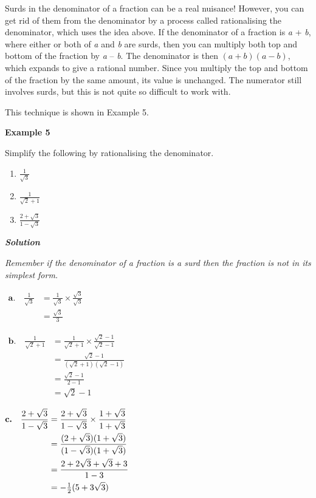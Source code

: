 \documentclass[
]{article}
\begin{document}
Surds in the denominator of a fraction can be a real nuisance! However,
you can get rid of them from the denominator by a process called
rationalising the denominator, which uses the idea above. If the
denominator of a fraction is \emph{a} + \emph{b}, where either or both
of \emph{a} and \emph{b} are surds, then you can multiply both top and
bottom of the fraction by \emph{a} -- \emph{b}. The denominator is then
\((a+b)(a-b)\), which expands to give a rational number. Since you
multiply the top and bottom of the fraction by the same amount, its
value is unchanged. The numerator still involves surds, but this is not
quite so difficult to work with.

This technique is shown in Example 5.

\textbf{Example 5}

Simplify the following by rationalising the denominator.

\begin{enumerate}
\def\labelenumi{(\alph{enumi})}
\item
  \(\frac{1}{{\sqrt 3 }}\)
\item
  \(\frac{1}{{\sqrt 2 + 1}}\)
\item
  \(\frac{{2 + \sqrt 3 }}{{1 - \sqrt 3 }}\)
\end{enumerate}

\textbf{\emph{Solution}}

\emph{Remember if the denominator of a fraction is a surd then the
fraction is not in its simplest form.}

\(\begin{align} \textbf{a.} \hspace{1em} \frac{1}{{\sqrt 3 }} &= \frac{1}{{\sqrt 3 }} \times \frac{{\sqrt 3 }}{{\sqrt 3 }}\\  &= \frac{{\sqrt 3 }}{3} \end{align}\)

\(\begin{align} \textbf{b.} \hspace{1em} \frac{1}{{\sqrt 2 + 1}} &= \frac{1}{{\sqrt 2 + 1}} \times \frac{{\sqrt 2 - 1}}{{\sqrt 2 - 1}}\\  &= \frac{{\sqrt 2 - 1}}{{(\sqrt 2 + 1)(\sqrt 2 - 1)}}\\  &= \frac{{\sqrt 2 - 1}}{{2 - 1}}\\  &= \sqrt 2 - 1 \end{align}\)

\(\begin{align} \textbf{c.} \hspace{1em} \frac{{2 + \sqrt 3 }}{{1 - \sqrt 3 }} &= \frac{{2 + \sqrt 3 }}{{1 - \sqrt 3 }} \times \frac{{1 + \sqrt 3 }}{{1 + \sqrt 3 }}\\  &= \frac{{(2 + \sqrt 3 )(1 + \sqrt 3 )}}{{(1 - \sqrt 3 )(1 + \sqrt 3 )}}\\  &= \frac{{2 + 2\sqrt 3 + \sqrt 3 + 3}}{{1 - 3}}\\  &= - {\textstyle{1 \over 2}}(5 + 3\sqrt 3 ) \end{align}\)
\end{document}
